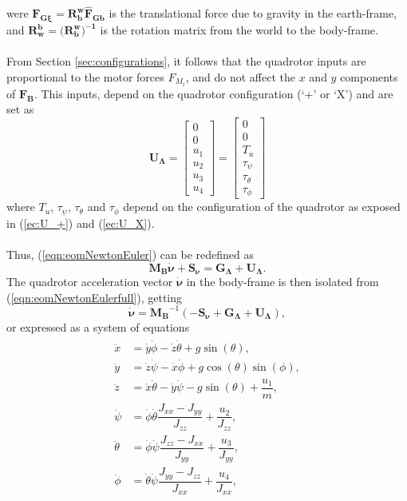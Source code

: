 were $\mathbf{F_{G\xi}}=\mathbf{R_{b}^{w}}\mathbf{\hat{F}_{Gb}}$ is the translational force due to  gravity in the earth-frame, and $\mathbf{R_{w}^{b}} = (\mathbf{R_{b}^{w})^{-1}}$ is the rotation matrix from the world to the body-frame.
\\\\
From Section \ref{sec:configurations}, it follows that the quadrotor inputs are proportional to the motor forces $F_{M_i}$, and do not affect the $x$ and $y$ components of $\mathbf{F_B}$. This inputs, depend on the quadrotor configuration (`+' or `X') and are set as
\begin{equation}
\mathbf{U_{\Lambda}} = \begin{bmatrix}
0 \\[5pt] 0 \\[5pt] u_1 \\[5pt] u_2 \\[5pt] u_3 \\[5pt] u_4
\end{bmatrix} = \begin{bmatrix}
0 \\[5pt] 0 \\[5pt] T_u\\[5pt]
	\tau_{\psi}\\[5pt]
	\tau_{\theta}\\[5pt]
	\tau_{\phi}
\end{bmatrix}
\end{equation}
where $T_u$, $\tau_\psi$, $\tau_\theta$ and $\tau_\phi$ depend on the configuration of the quadrotor as exposed in (\ref{ec:U_+}) and (\ref{ec:U_X}).
\\\\
Thus, (\ref{eqn:eomNewtonEuler}) can be redefined as
\begin{equation}
\label{eqn:eomNewtonEulerfull}
\mathbf{M_{B}}\mathbf{\dot{\nu}} + \mathbf{S_\nu} = \mathbf{G_{\Lambda}} + \mathbf{U_{\Lambda}}.
\end{equation}
The quadrotor acceleration vector $\mathbf{\dot{\nu}}$ in the body-frame is then isolated from (\ref{eqn:eomNewtonEulerfull}), getting
\begin{equation}
\mathbf{\dot{\nu}} = \mathbf{M_{B}}^{-1}(-\mathbf{S_\nu} + \mathbf{G_{\Lambda}} + \mathbf{U_{\Lambda}}),
\end{equation}
or expressed as a system of equations
\begin{align}
\begin{split}
\ddot{x} & = \dot{y} \dot{\phi} - \dot{z} \dot{\theta} + g \sin(\theta), \\[5pt]
\ddot{y} & = \dot{z} \dot{\psi} - \dot{x} \dot{\phi} + g \cos(\theta)\sin(\phi), \\[5pt]
\ddot{z} & = \dot{x} \dot{\theta} - \dot{y} \dot{\psi} - g \sin(\theta) + \dfrac{u_{1}}{m}, \\[5pt]
\ddot{\psi} & = \dot{\phi}\dot{\theta} \dfrac{J_{xx}-J_{yy}}{J_{zz}} + \dfrac{u_{2}}{J_{zz}}, \\[5pt]
\ddot{\theta} & = \dot{\phi} \dot{\psi}\dfrac{J_{zz}-J_{xx}}{J_{yy}} + \dfrac{u_{3}}{J_{yy}}, \\[5pt]
\ddot{\phi} & =  \dot{\theta}\dot{\psi}\dfrac{J_{yy}-J_{zz}}{J_{xx}} + \dfrac{u_{4}}{J_{xx}},
\end{split}
\end{align}
